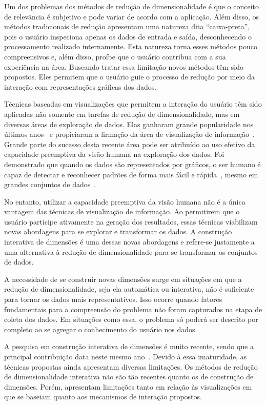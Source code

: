 Um dos problemas dos métodos de redução de dimensionalidade
é que o conceito de relevância é subjetivo e pode variar de
acordo com a aplicação. Além disso, os métodos tradicionais
de redução apresentam uma natureza dita ``caixa-preta'',
pois o usuário inspeciona apenas os dados de entrada e
saída, desconhecendo o processamento realizado internamente.
Esta natureza torna esses métodos pouco compreensivos e,
além disso, proíbe que o usuário contribua com a sua
experiência na área. Buscando tratar essa limitação novos
métodos têm sido propostos. Eles permitem que o usuário
guie o processo de redução por meio da interação com
representações gráficas dos dados.

Técnicas baseadas em visualizações que permitem a
interação do usuário têm sido aplicadas não somente em
tarefas de redução de dimensionalidade, mas em diversas
áreas de exploração de dados. Elas ganharam grande
popularidade nos últimos anos~\cite{State2012} e propiciaram
a firmação da área de visualização de
informação~\cite{Keim2002}. Grande parte do sucesso desta
recente área pode ser atribuído ao uso efetivo da capacidade
preemptiva da visão humana na exploração dos dados. Foi
demonstrado que quando os dados são representados por 
gráficos, o ser humano é capaz de detectar e reconhecer
padrões de forma mais fácil e rápida~\cite{Healey1995},
mesmo em grandes conjuntos de dados~\cite{Fodor2002}. 

No entanto, utilizar a capacidade preemptiva da visão humana
não é a única vantagem das técnicas de visualização de
informação. Ao permitirem que o usuário participe ativamente
na geração dos resultados, essas técnicas viabilizam novas
abordagens para se explorar e transformar os dados. A
construção interativa de dimensões é uma dessas novas
abordagens e refere-se justamente a uma alternativa à
redução de dimensionalidade para se transformar os conjuntos
de dados.

A necessidade de se construir novas dimensões surge em
situações em que a redução de dimensionalidade, seja ela
automática ou interativa, não é suficiente para tornar os
dados mais representativos.  Isso ocorre quando fatores
fundamentais para a compreensão do problema não foram
capturados na etapa de coleta dos dados. Em situações como
essa, o problema só poderá ser descrito por completo ao se
agregar o conhecimento do usuário nos dados.

A pesquisa em construção interativa de dimensões é muito
recente, sendo que a principal contribuição data neste mesmo
ano~\cite{Gladys2013}. Devido à essa imaturidade, as
técnicas propostas ainda apresentam diversas limitações. Os
métodos de redução de dimensionalidade interativa não são
tão recentes quanto os de construção de dimensões. Porém,
apresentam limitações tanto em relação às visualizações em
que se baseiam quanto aos mecanismos de interação propostos.

